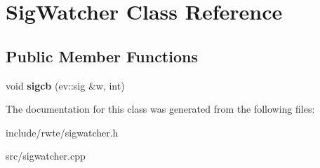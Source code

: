 \hypertarget{classSigWatcher}{}\section{Sig\+Watcher Class Reference}
\label{classSigWatcher}
\subsection*{Public Member Functions}
\begin{DoxyCompactItemize}
\item 
\mbox{\label{classSigWatcher_acaf6c54ae55c542de929298d18a6e931}} 
void {\bfseries sigcb} (ev\+::sig \&w, int)
\end{DoxyCompactItemize}


The documentation for this class was generated from the following files\+:\begin{DoxyCompactItemize}
\item 
include/rwte/sigwatcher.\+h\item 
src/sigwatcher.\+cpp\end{DoxyCompactItemize}
